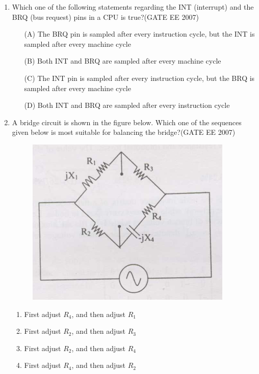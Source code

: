 \documentclass[a4paper,10pt]{exam}
\theoremstyle{remark}
\begin{document}
\begin{enumerate}
\vspace{1em}

\item 
Which one of the following statements regarding the INT (interrupt) and the BRQ (bus request) pins in a CPU is true?\hfill{(GATE EE 2007)}

\begin{enumerate}
    \item[(A)] The BRQ pin is sampled after every instruction cycle, but the INT is sampled after every machine cycle
    \item[(B)] Both INT and BRQ are sampled after every machine cycle
    \item[(C)] The INT pin is sampled after every instruction cycle, but the BRQ is sampled after every machine cycle
    \item[(D)] Both INT and BRQ are sampled after every instruction cycle
\end{enumerate}

\vspace{1em}

\item 
A bridge circuit is shown in the figure below. Which one of the sequences given below is most suitable for balancing the bridge?\hfill{(GATE EE 2007)}

\begin{figure}[H]
    \centering
    \includegraphics[width=0.5\linewidth]{figs/Q 70.png} \caption{}     \label{fig:myfigure}
\end{figure}

\begin{multicols}{2}
\begin{enumerate}
 \item  First adjust $R_4$, and then adjust $R_1$
\item   First adjust $R_2$, and then adjust $R_3$
 \item   First adjust $R_2$, and then adjust $R_4$
 \item  First adjust $R_4$, and then adjust $R_2$
 \end{enumerate}
\end{multicols}


\end{enumerate}
\end{document}
